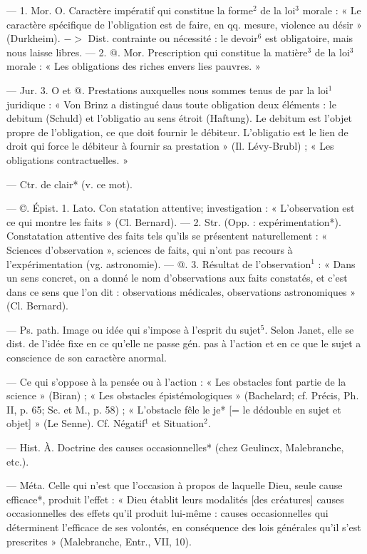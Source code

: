 \begin{itemize}[leftmargin=1cm, label=, itemsep=1pt]
 — 1. Mor. O. Caractère
impératif qui constitue la forme$^2$ de
la loi$^3$ morale : « Le caractère spécifique de l'obligation est de faire, en
qq. mesure, violence au désir »
(Durkheim). $->$ Dist. contrainte
ou nécessité : le devoir$^6$ est obligatoire, mais nous laisse libres. — 2.
@. Mor. Prescription qui constitue
la matière$^3$ de la loi$^3$ morale : « Les
obligations des riches envers lies
pauvres. »

— Jur. 3. O et @. Prestations
auxquelles nous sommes tenus de
par la loi$^1$ juridique : « Von Brinz a
distingué daus toute obligation
deux éléments : le debitum (Schuld)
et l’obligatio au sens étroit (Haftung).
Le debitum est l'objet propre de
l'obligation, ce que doit fournir le
débiteur. L'obligatio est le lien de
droit qui force le débiteur à fournir
sa prestation » (Il. Lévy-Brubl) ;
« Les obligations contractuelles. »

 — Ctr. de clair* (v. ce mot).

 — ©. Épist. 1. Lato. Con
statation attentive; investigation :
« L'observation est ce qui montre
les faits » (Cl. Bernard). — 2. Str.
(Opp. : expérimentation*). Constatation attentive des faits tels qu'ils se
présentent naturellement : « Sciences
d'observation », sciences de faits,
qui n'ont pas recours à l'expérimentation (vg. astronomie). — @. 3.
Résultat de l'observation$^1$ : « Dans
un sens concret, on a donné le nom
d'observations aux faits constatés,
et c’est dans ce sens que l’on dit :
observations médicales, observations astronomiques » (Cl. Bernard).

 — Ps. path. Image ou idée
qui s'impose à l'esprit du sujet$^5$.
Selon Janet, elle se dist. de l’idée
fixe en ce qu’elle ne passe gén. pas à
l’action et en ce que le sujet a conscience de son caractère anormal.

 — Ce qui s'oppose à la
pensée ou à l’action : « Les obstacles
font partie de la science » (Biran) ;
« Les obstacles épistémologiques »
(Bachelard; cf. Précis, Ph. II, p. 65;
Sc. et M., p. 58) ; « L’obstacle fêle
le je* [= le dédouble en sujet et
objet] » (Le Senne). Cf. Négatif$^1$ et
Situation$^2$.

 — Hist. À. Doctrine
des causes occasionnelles* (chez
Geulincx, Malebranche, etc.).

 — Méta. Celle
qui n’est que l’occasion à propos de
laquelle Dieu, seule cause efficace*,
produit l'effet : « Dieu établit leurs
modalités [des créatures] causes
occasionnelles des effets qu’il produit lui-même : causes occasionnelles qui déterminent l’efficace de
ses volontés, en conséquence des lois
générales qu'il s’est prescrites »
(Malebranche, Entr., VII, 10).


\end{itemize}
